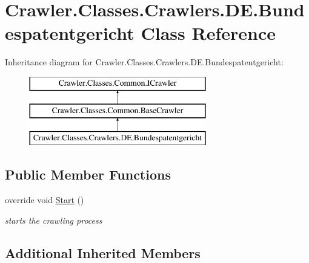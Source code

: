 \hypertarget{class_crawler_1_1_classes_1_1_crawlers_1_1_d_e_1_1_bundespatentgericht}{\section{Crawler.\-Classes.\-Crawlers.\-D\-E.\-Bundespatentgericht Class Reference}
\label{class_crawler_1_1_classes_1_1_crawlers_1_1_d_e_1_1_bundespatentgericht}
}
Inheritance diagram for Crawler.\-Classes.\-Crawlers.\-D\-E.\-Bundespatentgericht\-:\begin{figure}[H]
\begin{center}
\leavevmode
\includegraphics[height=3.000000cm]{class_crawler_1_1_classes_1_1_crawlers_1_1_d_e_1_1_bundespatentgericht}
\end{center}
\end{figure}
\subsection*{Public Member Functions}
\begin{DoxyCompactItemize}
\item 
override void \hyperlink{class_crawler_1_1_classes_1_1_crawlers_1_1_d_e_1_1_bundespatentgericht_a7185d1aecf109bfa9b34b7a66525e7b9}{Start} ()
\begin{DoxyCompactList}\small\item\em starts the crawling process \end{DoxyCompactList}\end{DoxyCompactItemize}
\subsection*{Additional Inherited Members}


